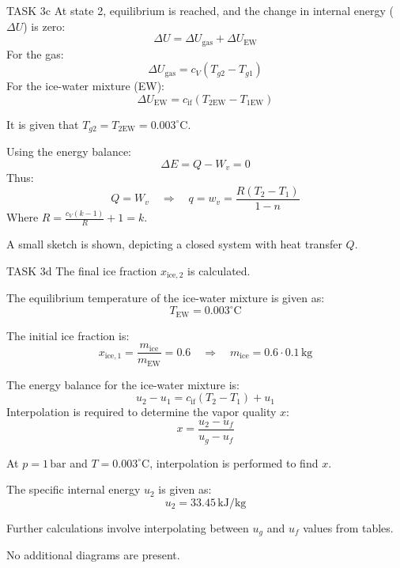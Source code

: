 TASK 3c  
At state 2, equilibrium is reached, and the change in internal energy (\( \Delta U \)) is zero:  
\[
\Delta U = \Delta U_{\text{gas}} + \Delta U_{\text{EW}}
\]  
For the gas:  
\[
\Delta U_{\text{gas}} = c_V (T_{g2} - T_{g1})
\]  
For the ice-water mixture (EW):  
\[
\Delta U_{\text{EW}} = c_{\text{if}} (T_{2\text{EW}} - T_{1\text{EW}})
\]  

It is given that \( T_{g2} = T_{2\text{EW}} = 0.003^\circ\text{C} \).  

Using the energy balance:  
\[
\Delta E = Q - W_v = 0
\]  
Thus:  
\[
Q = W_v \quad \Rightarrow \quad q = w_v = \frac{R(T_2 - T_1)}{1 - n}
\]  
Where \( R = \frac{c_V (k - 1)}{R} + 1 = k \).  

A small sketch is shown, depicting a closed system with heat transfer \( Q \).  

TASK 3d  
The final ice fraction \( x_{\text{ice},2} \) is calculated.  

The equilibrium temperature of the ice-water mixture is given as:  
\[
T_{\text{EW}} = 0.003^\circ\text{C}
\]  

The initial ice fraction is:  
\[
x_{\text{ice},1} = \frac{m_{\text{ice}}}{m_{\text{EW}}} = 0.6 \quad \Rightarrow \quad m_{\text{ice}} = 0.6 \cdot 0.1 \, \text{kg}
\]  

The energy balance for the ice-water mixture is:  
\[
u_2 - u_1 = c_{\text{if}} (T_2 - T_1) + u_1
\]  
Interpolation is required to determine the vapor quality \( x \):  
\[
x = \frac{u_2 - u_f}{u_g - u_f}
\]  

At \( p = 1 \, \text{bar} \) and \( T = 0.003^\circ\text{C} \), interpolation is performed to find \( x \).  

The specific internal energy \( u_2 \) is given as:  
\[
u_2 = 33.45 \, \text{kJ/kg}
\]  

Further calculations involve interpolating between \( u_g \) and \( u_f \) values from tables.  

No additional diagrams are present.